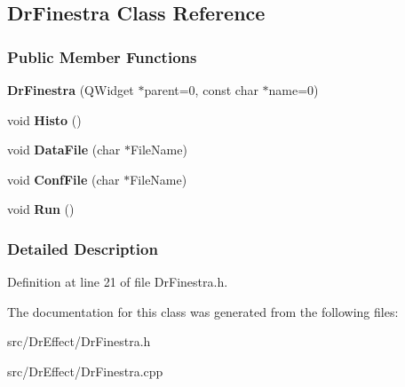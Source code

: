 \hypertarget{classDrFinestra}{\subsection{\-Dr\-Finestra \-Class \-Reference}
\label{classDrFinestra}
}
\subsubsection*{\-Public \-Member \-Functions}
\begin{DoxyCompactItemize}
\item 
\hypertarget{classDrFinestra_af085fd34d2ae2fbd63c5e0ed97e5bb81}{{\bfseries \-Dr\-Finestra} (\-Q\-Widget $\ast$parent=0, const char $\ast$name=0)}\label{classDrFinestra_af085fd34d2ae2fbd63c5e0ed97e5bb81}

\item 
\hypertarget{classDrFinestra_a8121ce6dcaabd895864fcb398d61830a}{void {\bfseries \-Histo} ()}\label{classDrFinestra_a8121ce6dcaabd895864fcb398d61830a}

\item 
\hypertarget{classDrFinestra_aafb2f0d8d425b1ae361f7bf1dd4c587f}{void {\bfseries \-Data\-File} (char $\ast$\-File\-Name)}\label{classDrFinestra_aafb2f0d8d425b1ae361f7bf1dd4c587f}

\item 
\hypertarget{classDrFinestra_a418fd69a796855fc20dcdaf6bb94fc68}{void {\bfseries \-Conf\-File} (char $\ast$\-File\-Name)}\label{classDrFinestra_a418fd69a796855fc20dcdaf6bb94fc68}

\item 
\hypertarget{classDrFinestra_aa3eca255b6be227d7d901cc2a72017a5}{void {\bfseries \-Run} ()}\label{classDrFinestra_aa3eca255b6be227d7d901cc2a72017a5}

\end{DoxyCompactItemize}


\subsubsection{\-Detailed \-Description}


\-Definition at line 21 of file \-Dr\-Finestra.\-h.



\-The documentation for this class was generated from the following files\-:\begin{DoxyCompactItemize}
\item 
src/\-Dr\-Effect/\-Dr\-Finestra.\-h\item 
src/\-Dr\-Effect/\-Dr\-Finestra.\-cpp\end{DoxyCompactItemize}
